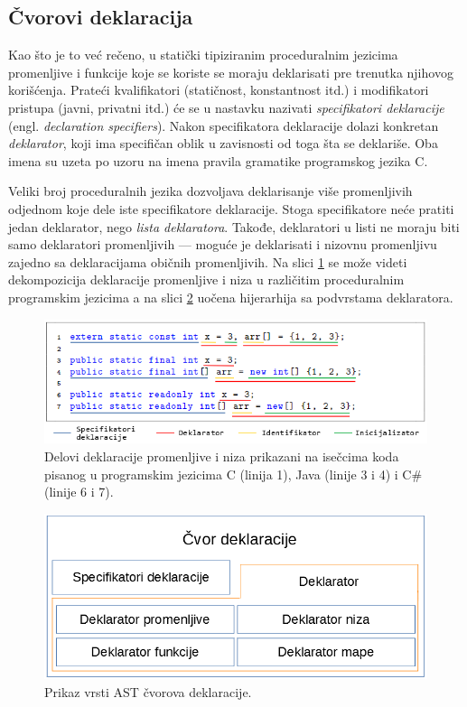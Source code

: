 \subsection{Čvorovi deklaracija}
\label{subsec:MyASTDeclarationNodes}

Kao što je to već rečeno, u statički tipiziranim proceduralnim jezicima promenljive i funkcije koje se koriste se moraju deklarisati pre trenutka njihovog korišćenja. Prateći kvalifikatori (statičnost, konstantnost itd.) i modifikatori pristupa (javni, privatni itd.) će se u nastavku nazivati \emph{specifikatori deklaracije} (engl. \emph{declaration specifiers}). Nakon specifikatora deklaracije dolazi konkretan \emph{deklarator}, koji ima specifičan oblik u zavisnosti od toga šta se deklariše. Oba imena su uzeta po uzoru na imena pravila gramatike programskog jezika C. 

Veliki broj proceduralnih jezika dozvoljava deklarisanje više promenljivih odjednom koje dele iste specifikatore deklaracije. Stoga specifikatore neće pratiti jedan deklarator, nego \emph{lista deklaratora}. Takođe, deklaratori u listi ne moraju biti samo deklaratori promenljivih --- moguće je deklarisati i nizovnu promenljivu zajedno sa deklaracijama običnih promenljivih. Na slici \ref{fig:DeclarationParts} se može videti dekompozicija deklaracije promenljive i niza u različitim proceduralnim programskim jezicima a na slici \ref{fig:DeclarationNodes} uočena hijerarhija sa podvrstama deklaratora.

\begin{figure}[h!]
\centering
\includegraphics[scale=0.8]{images/declaration_decomposition.png}
\caption{Delovi deklaracije promenljive i niza prikazani na isečcima koda pisanog u programskim jezicima C (linija 1), Java (linije 3 i 4) i C\# (linije 6 i 7).}
\label{fig:DeclarationParts}
\end{figure}

\begin{figure}[h!]
\centering
\includegraphics[scale=0.5]{images/declaration_nodes.png}
\caption{Prikaz vrsti AST čvorova deklaracije.}
\label{fig:DeclarationNodes}
\end{figure}

